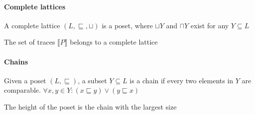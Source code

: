 \paragraph{Complete lattices}
\enumstart
	\item A complete lattice $(L, \sqsubseteq, \sqcup)$ is a poset, where $\sqcup Y$ and $\sqcap Y$ exist for any $Y \subseteq L$
	\item The set of traces $\llbracket P \rrbracket$ belongs to a complete lattice
\enumend

\paragraph{Chains}
\enumstart
	\item Given a poset $(L, \sqsubseteq)$, a subset $Y \subseteq L$ is a chain if every two elements in $Y$ are comparable. $\forall x,y \in Y: (x \sqsubseteq y) \lor (y \sqsubseteq x)$
	\item The height of the poset is the chain with the largest size
\enumend

